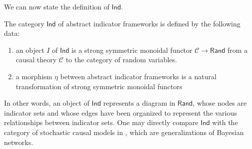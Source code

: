 \documentclass[sigconf]{acmart}
\newcommand{\Cat}[1]{\mathsf{#1}}
\def\Ind{\Cat{Ind}}
\def\Rand{\Cat{Rand}}
\def\Cor{\textnormal{Cor}}
\def\Stoch{\Cat{Stoch}}
\begin{document}

We can now state the definition of $\Ind$.

\begin{definition}The category $\Ind$ of abstract indicator frameworks is defined by the following data:
\begin{enumerate}
\item an object $I$ of $\Ind$ is a strong symmetric monoidal functor $\mathcal{C} \to \Rand$ from a causal theory $\mathcal{C}$ to the category of random variables.
\item a morphism $\eta$ between abstract indicator frameworks is a natural transformation of strong symmetric monoidal functors
\end{enumerate}
\end{definition}

In other words, an object of $\Ind$ represents a diagram in $\Rand$, whose nodes are indicator sets and whose edges have been organized to represent the various relationships between indicator sets. One may directly compare $\Ind$ with the category of stochastic causal models in \cite{fong13}, which are generalizations of Bayesian networks.
\end{document}
